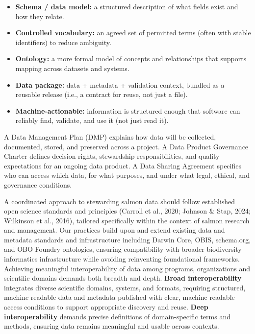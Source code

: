 \documentclass[
  letterpaper,
  DIV=11,
  numbers=noendperiod]{scrartcl}
\providecommand{\tightlist}{%
  \setlength{\itemsep}{0pt}\setlength{\parskip}{0pt}}
\begin{document}
\begin{tcolorbox}[enhanced jigsaw, opacitybacktitle=0.6, left=2mm, coltitle=black, opacityback=0, colbacktitle=quarto-callout-note-color!10!white, titlerule=0mm, colback=white, leftrule=.75mm, toprule=.15mm, bottomtitle=1mm, toptitle=1mm, title=\textcolor{quarto-callout-note-color}{\faInfo}\hspace{0.5em}{Key terms (quick primer)}, rightrule=.15mm, breakable, colframe=quarto-callout-note-color-frame, arc=.35mm, bottomrule=.15mm]

\begin{itemize}
\tightlist
\item
  \textbf{Schema / data model:} a structured description of what fields
  exist and how they relate.
\item
  \textbf{Controlled vocabulary:} an agreed set of permitted terms
  (often with stable identifiers) to reduce ambiguity.
\item
  \textbf{Ontology:} a more formal model of concepts and relationships
  that supports mapping across datasets and systems.
\item
  \textbf{Data package:} data + metadata + validation context, bundled
  as a reusable release (i.e., a contract for reuse, not just a file).
\item
  \textbf{Machine-actionable:} information is structured enough that
  software can reliably find, validate, and use it (not just read it).
\end{itemize}

\end{tcolorbox}

A Data Management Plan (DMP) explains how data will be collected,
documented, stored, and preserved across a project. A Data Product
Governance Charter defines decision rights, stewardship
responsibilities, and quality expectations for an ongoing data product.
A Data Sharing Agreement specifies who can access which data, for what
purposes, and under what legal, ethical, and governance conditions.

A coordinated approach to stewarding salmon data should follow
established open science standards and principles (Carroll et al., 2020;
Johnson \& Stap, 2024; Wilkinson et al., 2016), tailored specifically
within the context of salmon research and management. Our practices
build upon and extend existing data and metadata standards and
infrastructure including Darwin Core, OBIS, schema.org, and OBO Foundry
ontologies, ensuring compatibility with broader biodiversity informatics
infrastructure while avoiding reinventing foundational frameworks.
Achieving meaningful interoperability of data among programs,
organizations and scientific domains demands both breadth and depth.
\textbf{Broad interoperability} integrates diverse scientific domains,
systems, and formats, requiring structured, machine-readable data and
metadata published with clear, machine-readable access conditions to
support appropriate discovery and reuse. \textbf{Deep interoperability}
demands precise definitions of domain-specific terms and methods,
ensuring data remains meaningful and usable across contexts.
\end{document}
